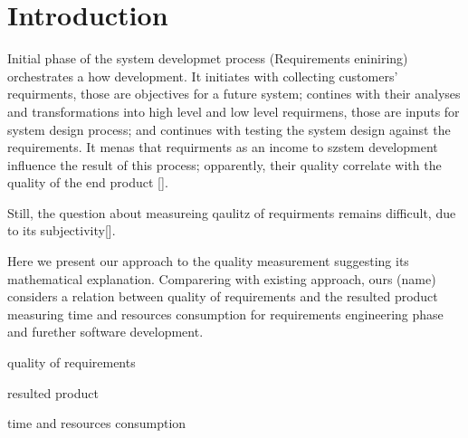\section{Introduction}
\label{sec:Intro} 
Initial phase of the system developmet process (Requirements eniniring) orchestrates a how development. It initiates with collecting customers' requirments, those are objectives for a future system; contines with their  analyses and transformations into high level and low level requirmens, those are inputs for system design process; and continues with testing the system design against the requirements. It menas that requirments as an income to szstem development influence the result of this process; opparently,  their quality correlate with the quality of the end product [].  

Still, the question about measureing qaulitz of requirments remains difficult, due to its subjectivity[].

 Here we present our approach to the quality measurement suggesting its mathematical explanation. Comparering with existing approach, ours (name) considers a relation between quality of requirements and the resulted product measuring time and resources consumption for requirements engineering phase and furether software development.

quality of requirements

resulted product

time and resources consumption 